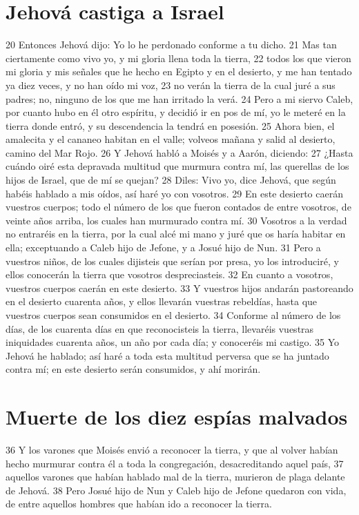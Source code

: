\section*{Jehová castiga a Israel }

20 Entonces Jehová dijo: Yo lo he perdonado conforme a tu dicho.
21 Mas tan ciertamente como vivo yo, y mi gloria llena toda la tierra,
22 todos los que vieron mi gloria y mis señales que he hecho en Egipto y en el desierto, y me han tentado ya diez veces, y no han oído mi voz,
23 no verán la tierra de la cual juré a sus padres; no, ninguno de los que me han irritado la verá.
24 Pero a mi siervo Caleb, por cuanto hubo en él otro espíritu, y decidió ir en pos de mí, yo le meteré en la tierra donde entró, y su descendencia la tendrá en posesión.
25 Ahora bien, el amalecita y el cananeo habitan en el valle; volveos mañana y salid al desierto, camino del Mar Rojo.
26 Y Jehová habló a Moisés y a Aarón, diciendo:
27 ¿Hasta cuándo oiré esta depravada multitud que murmura contra mí, las querellas de los hijos de Israel, que de mí se quejan?
28 Diles: Vivo yo, dice Jehová, que según habéis hablado a mis oídos, así haré yo con vosotros. 
29 En este desierto caerán vuestros cuerpos; todo el número de los que fueron contados de entre vosotros, de veinte años arriba, los cuales han murmurado contra mí.
30 Vosotros a la verdad no entraréis en la tierra, por la cual alcé mi mano y juré que os haría habitar en ella; exceptuando a Caleb hijo de Jefone, y a Josué hijo de Nun.
31 Pero a vuestros niños, de los cuales dijisteis que serían por presa, yo los introduciré, y ellos conocerán la tierra que vosotros despreciasteis.
32 En cuanto a vosotros, vuestros cuerpos caerán en este desierto.
33 Y vuestros hijos andarán pastoreando en el desierto cuarenta años, y ellos llevarán vuestras rebeldías, hasta que vuestros cuerpos sean consumidos en el desierto.
34 Conforme al número de los días, de los cuarenta días en que reconocisteis la tierra, llevaréis vuestras iniquidades cuarenta años, un año por cada día; y conoceréis mi castigo.
35 Yo Jehová he hablado; así haré a toda esta multitud perversa que se ha juntado contra mí; en este desierto serán consumidos, y ahí morirán.

\section*{Muerte de los diez espías malvados}

36 Y los varones que Moisés envió a reconocer la tierra, y que al volver habían hecho murmurar contra él a toda la congregación, desacreditando aquel país,
37 aquellos varones que habían hablado mal de la tierra, murieron de plaga delante de Jehová.
38 Pero Josué hijo de Nun y Caleb hijo de Jefone quedaron con vida, de entre aquellos hombres que habían ido a reconocer la tierra.

